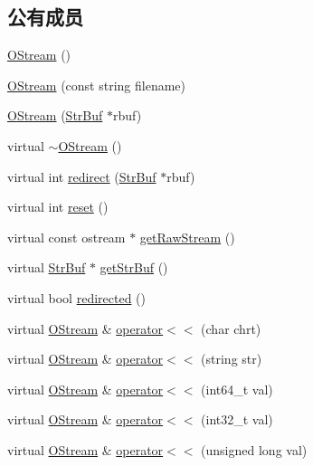 \subsection*{公有成员}
\begin{DoxyCompactItemize}
\item 
\hyperlink{classHSF_1_1OStream_aa5114fea384c827743a416287447b840}{OStream} ()
\item 
\hyperlink{classHSF_1_1OStream_aeea5b502867b5796d3442dca543699ae}{OStream} (const string filename)
\item 
\hyperlink{classHSF_1_1OStream_aa9dec59af482b209a4a4d89cd6ff99e5}{OStream} (\hyperlink{namespaceHSF_a099dd77b4cb045fbbd0fb0dd0946e198}{StrBuf} $\ast$rbuf)
\item 
virtual \hyperlink{classHSF_1_1OStream_ad18f77a28e352d3e23f53eb67e7fd6fd}{$\sim$OStream} ()
\item 
virtual int \hyperlink{classHSF_1_1OStream_aedd010fc73297368032ada516d0577d8}{redirect} (\hyperlink{namespaceHSF_a099dd77b4cb045fbbd0fb0dd0946e198}{StrBuf} $\ast$rbuf)
\item 
virtual int \hyperlink{classHSF_1_1OStream_ac3d63743046e59e7f27aa3dde0f6b68c}{reset} ()
\item 
virtual const ostream $\ast$ \hyperlink{classHSF_1_1OStream_ac2d4330afcd5b968c3bbceb739785fe2}{getRawStream} ()
\item 
virtual \hyperlink{namespaceHSF_a099dd77b4cb045fbbd0fb0dd0946e198}{StrBuf} $\ast$ \hyperlink{classHSF_1_1OStream_a28f9c27531a8839602aafa81dccbb543}{getStrBuf} ()
\item 
virtual bool \hyperlink{classHSF_1_1OStream_ab478550e6310a030950dd8d8f354562b}{redirected} ()
\item 
virtual \hyperlink{classHSF_1_1OStream}{OStream} \& \hyperlink{classHSF_1_1OStream_ad542e8e0a3da490c9df517819fe174ca}{operator$<$$<$} (char chrt)
\item 
virtual \hyperlink{classHSF_1_1OStream}{OStream} \& \hyperlink{classHSF_1_1OStream_a1e3204a3bf16caf916d3e18c562a709c}{operator$<$$<$} (string str)
\item 
virtual \hyperlink{classHSF_1_1OStream}{OStream} \& \hyperlink{classHSF_1_1OStream_a771b87dab59786db30cf1d5eb5473e64}{operator$<$$<$} (int64\_\-t val)
\item 
virtual \hyperlink{classHSF_1_1OStream}{OStream} \& \hyperlink{classHSF_1_1OStream_a1bbf47f6f3c68938fb4c1006b878aa60}{operator$<$$<$} (int32\_\-t val)
\item 
virtual \hyperlink{classHSF_1_1OStream}{OStream} \& \hyperlink{classHSF_1_1OStream_ae4edb4f375ace6dab22021629c29a24f}{operator$<$$<$} (unsigned long val)

\end{DoxyCompactItemize}
